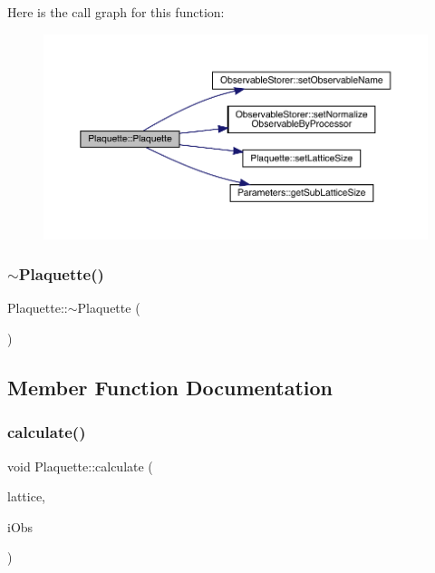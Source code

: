 Here is the call graph for this function\+:\nopagebreak
\begin{figure}[H]
\begin{center}
\leavevmode
\includegraphics[width=350pt]{class_plaquette_a1c87b43fc7ee74b2b0289de63e03bb61_cgraph}
\end{center}
\end{figure}
\mbox{\label{class_plaquette_a8730cb08bee0e0f9260bf8f11f52b8c0}} 
\subsubsection{\texorpdfstring{$\sim$Plaquette()}{~Plaquette()}}
{\footnotesize\ttfamily Plaquette\+::$\sim$\+Plaquette (\begin{DoxyParamCaption}{ }\end{DoxyParamCaption})}



\subsection{Member Function Documentation}
\mbox{\label{class_plaquette_a40cae6fd587c14836bdf61e69c615a00}} 
\subsubsection{\texorpdfstring{calculate()}{calculate()}}
{\footnotesize\ttfamily void Plaquette\+::calculate (\begin{DoxyParamCaption}\item[{\mbox{\hyperlink{class_lattice}{Lattice}}$<$ \mbox{\hyperlink{class_s_u3}{S\+U3}} $>$ $\ast$}]{lattice,  }\item[{unsigned int}]{i\+Obs }\end{DoxyParamCaption})\hspace{0.3cm}{\ttfamily [virtual]}}



